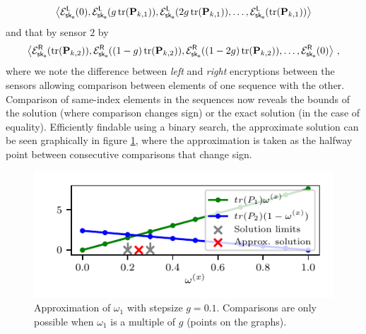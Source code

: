 \begin{equation}\label{eq:cloud_fusion:secfci_2sen_enc_seq_1}
    \left\langle\mathcal{E}^{\mathsf{L}}_{\mathsf{sk}_{\mathsf{o}}}(0), \mathcal{E}^{\mathsf{L}}_{\mathsf{sk}_{\mathsf{o}}}(g\operatorname{tr}({{\mathbf{P}}}_{k,1})), \mathcal{E}^{\mathsf{L}}_{\mathsf{sk}_{\mathsf{o}}}(2g\operatorname{tr}({{\mathbf{P}}}_{k,1})),\dots,\mathcal{E}^{\mathsf{L}}_{\mathsf{sk}_{\mathsf{o}}}(\operatorname{tr}({{\mathbf{P}}}_{k,1}))\right\rangle
\end{equation}
and that by sensor $2$ by
\begin{equation}\label{eq:cloud_fusion:secfci_2sen_enc_seq_2}
    \left\langle\mathcal{E}^{\mathsf{R}}_{\mathsf{sk}_{\mathsf{o}}}(\operatorname{tr}({{\mathbf{P}}}_{k,2})), \mathcal{E}^{\mathsf{R}}_{\mathsf{sk}_{\mathsf{o}}}((1-g)\operatorname{tr}({{\mathbf{P}}}_{k,2})), \mathcal{E}^{\mathsf{R}}_{\mathsf{sk}_{\mathsf{o}}}((1-2g)\operatorname{tr}({{\mathbf{P}}}_{k,2})),\dots,\mathcal{E}^{\mathsf{R}}_{\mathsf{sk}_{\mathsf{o}}}(0)\right\rangle\,,
\end{equation}
where we note the difference between \textit{left} and \textit{right} encryptions between the sensors allowing comparison between elements of one sequence with the other. Comparison of same-index elements in the sequences now reveals the bounds of the solution (where comparison changes sign) or the exact solution (in the case of equality). Efficiently findable using a binary search, the approximate solution can be seen graphically in figure \ref{fig:cloud_fusion:secfci_2sen_intersect}, where the approximation is taken as the halfway point between consecutive comparisons that change sign.
\begin{figure}[htbp]
    \begin{center}
       \includegraphics{figures/2_sensors.pdf}
    \end{center}
    \caption{Approximation of $\omega_1$ with stepsize $g=0.1$. Comparisons are only possible when $\omega_1$ is a multiple of $g$ (points on the graphs).}
    \label{fig:cloud_fusion:secfci_2sen_intersect}
 \end{figure}

